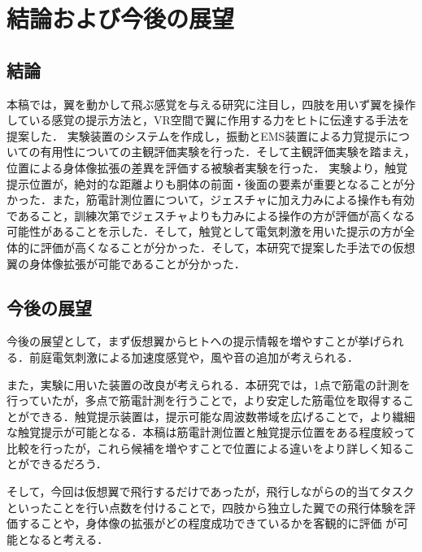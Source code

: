 \chapter[結論および今後の展望]%
        {結論および今後の展望}

\section{結論}
    本稿では，翼を動かして飛ぶ感覚を与える研究に注目し，四肢を用いず翼を操作している感覚の提示方法と，VR空間で翼に作用する力をヒトに伝達する手法を提案した．
    実験装置のシステムを作成し，振動とEMS装置による力覚提示についての有用性についての主観評価実験を行った．そして主観評価実験を踏まえ，位置による身体像拡張の差異を評価する被験者実験を行った．
    実験より，触覚提示位置が，絶対的な距離よりも胴体の前面・後面の要素が重要となることが分かった．また，筋電計測位置について，ジェスチャに加え力みによる操作も有効であること，訓練次第でジェスチャよりも力みによる操作の方が評価が高くなる可能性があることを示した．そして，触覚として電気刺激を用いた提示の方が全体的に評価が高くなることが分かった．そして，本研究で提案した手法での仮想翼の身体像拡張が可能であることが分かった．

    
\section{今後の展望}
    今後の展望として，まず仮想翼からヒトへの提示情報を増やすことが挙げられる．前庭電気刺激による加速度感覚\cite{maeda2005shaking}\cite{青山一真2014前庭電気刺激における逆方向不感電流を用いた加速度感覚の増強}や，風や音の追加が考えられる．

    また，実験に用いた装置の改良が考えられる．本研究では，1点で筋電の計測を行っていたが，多点で筋電計測を行うことで，より安定した筋電位を取得することができる\cite{白石恵1992筋電位多点計測による体幹背部の神経支配帯の分布}．触覚提示装置は，提示可能な周波数帯域を広げることで，より繊細な触覚提示が可能となる．本稿は筋電計測位置と触覚提示位置をある程度絞って比較を行ったが，これら候補を増やすことで位置による違いをより詳しく知ることができるだろう．

    そして，今回は仮想翼で飛行するだけであったが，飛行しながらの的当てタスクといったことを行い点数を付けることで，四肢から独立した翼での飛行体験を評価することや，身体像の拡張がどの程度成功できているかを客観的に評価
    が可能となると考える．
  
